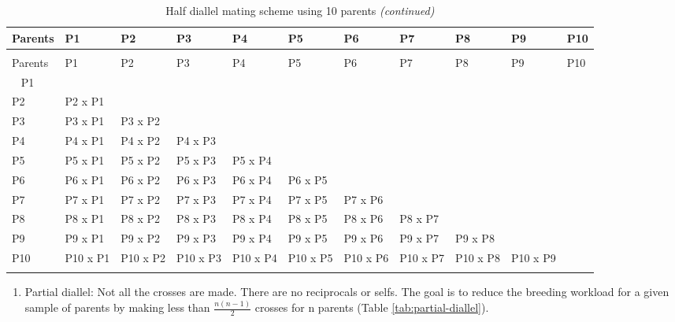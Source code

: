\documentclass[nofonts,]{tufte-handout}
\providecommand{\tightlist}{%
  \setlength{\itemsep}{0pt}\setlength{\parskip}{0pt}}
\begin{document}
\begingroup\fontsize{8}{10}\selectfont

\begin{longtable}[t]{>{\raggedright\arraybackslash}p{3.5em}>{\raggedright\arraybackslash}p{3.5em}>{\raggedright\arraybackslash}p{3.5em}>{\raggedright\arraybackslash}p{3.5em}>{\raggedright\arraybackslash}p{3.5em}>{\raggedright\arraybackslash}p{3.5em}>{\raggedright\arraybackslash}p{3.5em}>{\raggedright\arraybackslash}p{3.5em}>{\raggedright\arraybackslash}p{3.5em}>{\raggedright\arraybackslash}p{3.5em}>{\raggedright\arraybackslash}p{3.5em}}
\caption{\label{tab:half-diallel}Half diallel mating scheme using 10 parents}\\
\toprule
Parents & P1 & P2 & P3 & P4 & P5 & P6 & P7 & P8 & P9 & P10\\
\midrule
\endfirsthead
\caption[]{Half diallel mating scheme using 10 parents \textit{(continued)}}\\
\toprule
Parents & P1 & P2 & P3 & P4 & P5 & P6 & P7 & P8 & P9 & P10\\
\midrule
\endhead
\
\endfoot
\bottomrule
\endlastfoot
\rowcolor{gray!6}  P1 &  &  &  &  &  &  &  &  &  & \\
P2 & P2 x P1 &  &  &  &  &  &  &  &  & \\
\rowcolor{gray!6}  P3 & P3 x P1 & P3 x P2 &  &  &  &  &  &  &  & \\
P4 & P4 x P1 & P4 x P2 & P4 x P3 &  &  &  &  &  &  & \\
\rowcolor{gray!6}  P5 & P5 x P1 & P5 x P2 & P5 x P3 & P5 x P4 &  &  &  &  &  & \\
\addlinespace
P6 & P6 x P1 & P6 x P2 & P6 x P3 & P6 x P4 & P6 x P5 &  &  &  &  & \\
\rowcolor{gray!6}  P7 & P7 x P1 & P7 x P2 & P7 x P3 & P7 x P4 & P7 x P5 & P7 x P6 &  &  &  & \\
P8 & P8 x P1 & P8 x P2 & P8 x P3 & P8 x P4 & P8 x P5 & P8 x P6 & P8 x P7 &  &  & \\
\rowcolor{gray!6}  P9 & P9 x P1 & P9 x P2 & P9 x P3 & P9 x P4 & P9 x P5 & P9 x P6 & P9 x P7 & P9 x P8 &  & \\
P10 & P10 x P1 & P10 x P2 & P10 x P3 & P10 x P4 & P10 x P5 & P10 x P6 & P10 x P7 & P10 x P8 & P10 x P9 & \\*
\end{longtable}
\endgroup{}

\clearpage

\begin{enumerate}
\def\labelenumi{\arabic{enumi}.}
\setcounter{enumi}{2}
\tightlist
\item
  Partial diallel: Not all the crosses are made. There are no
  reciprocals or selfs. The goal is to reduce the breeding workload for
  a given sample of parents by making less than \(\frac{n(n-1)}{2}\)
  crosses for n parents (Table \ref{tab:partial-diallel}).
\end{enumerate}
\end{document}

